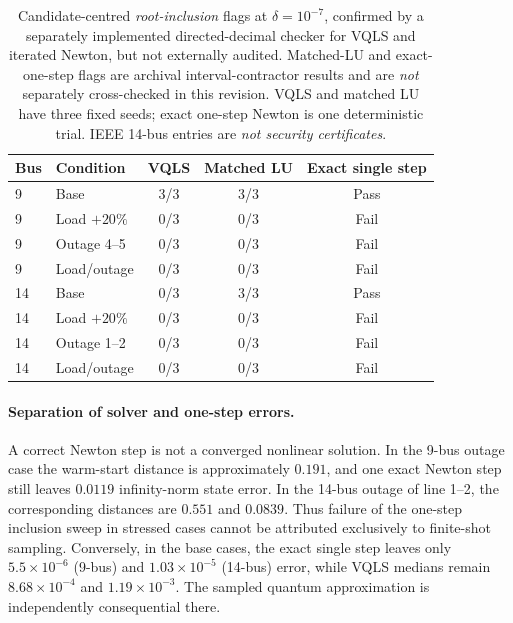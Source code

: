 \documentclass[11pt,a4paper]{article}
\theoremstyle{remark}\newtheorem{remark}[theorem]{Remark}
\begin{document}
\begin{table}[htbp]\centering\small
\caption{Candidate-centred \emph{root-inclusion} flags at $\delta=10^{-7}$, confirmed by a separately implemented directed-decimal checker for VQLS and iterated Newton, but not externally audited. Matched-LU and exact-one-step flags are archival interval-contractor results and are \emph{not} separately cross-checked in this revision. VQLS and matched LU have three fixed seeds; exact one-step Newton is one deterministic trial. IEEE 14-bus entries are \emph{not security certificates}.}
\begin{tabular}{@{}llccc@{}}\toprule
Bus & Condition & VQLS & Matched LU & Exact single step \\\midrule
9 & Base & 3/3 & 3/3 & Pass \\
9 & Load $+20\%$ & 0/3 & 0/3 & Fail \\
9 & Outage 4--5 & 0/3 & 0/3 & Fail \\
9 & Load/outage & 0/3 & 0/3 & Fail \\
14 & Base & 0/3 & 3/3 & Pass \\
14 & Load $+20\%$ & 0/3 & 0/3 & Fail \\
14 & Outage 1--2 & 0/3 & 0/3 & Fail \\
14 & Load/outage & 0/3 & 0/3 & Fail \\
\bottomrule\end{tabular}\label{tab:flags}\end{table}

\paragraph{Separation of solver and one-step errors.} A correct Newton step is not a converged nonlinear solution. In the 9-bus outage case the warm-start distance is approximately $0.191$, and one exact Newton step still leaves $0.0119$ infinity-norm state error. In the 14-bus outage of line 1--2, the corresponding distances are $0.551$ and $0.0839$. Thus failure of the one-step inclusion sweep in stressed cases cannot be attributed exclusively to finite-shot sampling. Conversely, in the base cases, the exact single step leaves only $5.5\times10^{-6}$ (9-bus) and $1.03\times10^{-5}$ (14-bus) error, while VQLS medians remain $8.68\times10^{-4}$ and $1.19\times10^{-3}$. The sampled quantum approximation is independently consequential there.
\end{document}
